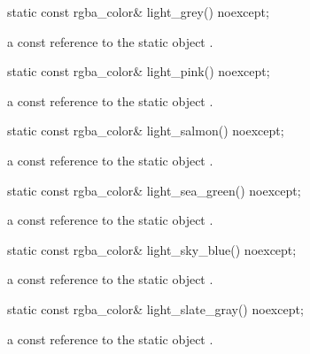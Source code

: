 \begin{itemdecl}
static const rgba_color& light_grey() noexcept;
\end{itemdecl}
\begin{itemdescr}
\pnum
\returns
a const reference to the static  object .
\end{itemdescr}

\begin{itemdecl}
static const rgba_color& light_pink() noexcept;
\end{itemdecl}
\begin{itemdescr}
\pnum
\returns
a const reference to the static  object .
\end{itemdescr}

\begin{itemdecl}
static const rgba_color& light_salmon() noexcept;
\end{itemdecl}
\begin{itemdescr}
\pnum
\returns
a const reference to the static  object .
\end{itemdescr}

\begin{itemdecl}
static const rgba_color& light_sea_green() noexcept;
\end{itemdecl}
\begin{itemdescr}
\pnum
\returns
a const reference to the static  object .
\end{itemdescr}

\begin{itemdecl}
static const rgba_color& light_sky_blue() noexcept;
\end{itemdecl}
\begin{itemdescr}
\pnum
\returns
a const reference to the static  object .
\end{itemdescr}

\begin{itemdecl}
static const rgba_color& light_slate_gray() noexcept;
\end{itemdecl}
\begin{itemdescr}
\pnum
\returns
a const reference to the static  object .
\end{itemdescr}

